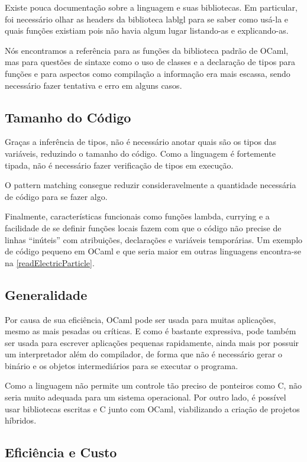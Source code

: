 \documentclass[a4paper,10pt]{article}
\begin{document}
		Existe pouca documentação sobre a linguagem e suas bibliotecas. Em particular, foi necessário olhar as headers da biblioteca lablgl para se saber como usá-la e quais funções existiam pois não havia algum lugar listando-as e explicando-as.
		
		Nós encontramos a referência para as funções da biblioteca padrão de OCaml, mas para questões de sintaxe como o uso de classes e a declaração de tipos para funções e para aspectos como compilação a informação era mais escassa, sendo necessário fazer tentativa e erro em alguns casos.
		
	\subsection{Tamanho do Código}
		
		Graças a inferência de tipos, não é necessário anotar quais são os tipos das variáveis, reduzindo o tamanho do código. Como a linguagem é fortemente tipada, não é necessário fazer verificação de tipos em execução.
		
		O pattern matching consegue reduzir consideravelmente a quantidade necessária de código para se fazer algo.
		
		Finalmente, características funcionais como funções lambda, currying e a facilidade de se definir funções locais fazem com que o código não precise de linhas ``inúteis'' com atribuições, declarações e variáveis temporárias. Um exemplo de código pequeno em OCaml e que seria maior em outras linguagens encontra-se na \autoref{readElectricParticle}.
		
	\subsection{Generalidade}
	
		Por causa de sua eficiência, OCaml pode ser usada para muitas aplicações, mesmo as mais pesadas ou críticas. E como é bastante expressiva, pode também ser usada para escrever aplicações pequenas rapidamente, ainda mais por possuir um interpretador além do compilador, de forma que não é necessário gerar o binário e os objetos intermediários para se executar o programa.
		
		Como a linguagem não permite um controle tão preciso de ponteiros como C, não seria muito adequada para um sistema operacional. Por outro lado, é possível usar bibliotecas escritas e C junto com OCaml, viabilizando a criação de projetos híbridos.
	
	\subsection{Eficiência e Custo}
	
\end{document}
